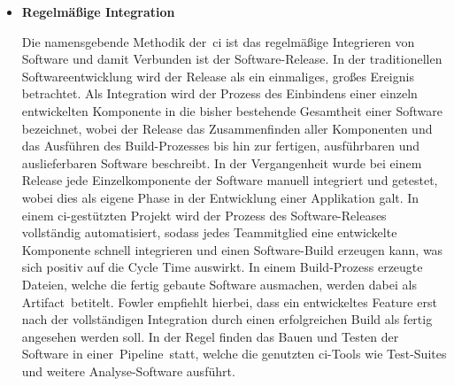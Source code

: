 \begin{itemize}
    \item {
        \textbf{Regelmäßige Integration}\par
        Die namensgebende Methodik der\ \acrshort{ci} ist das regelmäßige Integrieren von Software und damit Verbunden
        ist der Software-Release.
        In der traditionellen Softwareentwicklung wird der Release als ein einmaliges, großes Ereignis betrachtet.
        Als Integration wird der Prozess des Einbindens einer einzeln entwickelten Komponente in die bisher bestehende
        Gesamtheit einer Software bezeichnet, wobei der Release das Zusammenfinden aller Komponenten und das Ausführen
        des Build-Prozesses bis hin zur fertigen, ausführbaren und auslieferbaren Software beschreibt.
        In der Vergangenheit wurde bei einem Release jede Einzelkomponente der Software manuell integriert und getestet,
        wobei dies als eigene Phase in der Entwicklung einer Applikation galt.
        In einem \acrshort{ci}-gestützten Projekt wird der Prozess des Software-Releases vollständig automatisiert,
        sodass jedes Teammitglied eine entwickelte Komponente schnell integrieren und einen Software-Build erzeugen
        kann, was sich positiv auf die Cycle Time auswirkt.
        In einem Build-Prozess erzeugte Dateien, welche die fertig gebaute Software ausmachen, werden dabei als\ \glqq
        Artifact\grqq\ betitelt.
        Fowler empfiehlt hierbei, dass ein entwickeltes Feature erst nach der vollständigen Integration durch einen
        erfolgreichen Build als fertig angesehen werden soll.
        In der Regel finden das Bauen und Testen der Software in einer\ \glqq Pipeline\grqq\ statt, welche die genutzten
        \acrshort{ci}-Tools wie Test-Suites und weitere Analyse-Software ausführt.
    }


\end{itemize}

